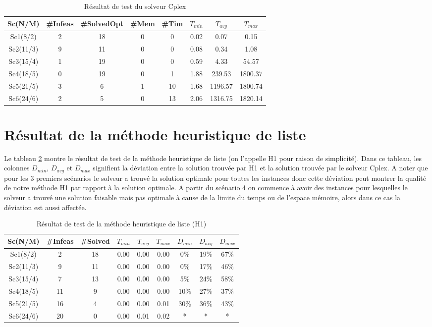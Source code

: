 \documentclass[twoside,fleqn]{EPURapport}
\begin{document}
\begin{table}[h]
    \centering
    \begin{tabular}{|c|c|c|c|c|c|c|c|}
    	\hline
    	Sc(N/M)	& \#Infeas & \#SolvedOpt	& \#Mem & \#Tim & $T_{min}$ & $T_{avg}$	& $T_{max}$ \\ \hline
		Sc1(8/2) & 2 & 18 & 0 & 0 &  0.02 &  0.07 &  0.15 \\ \hline
		Sc2(11/3) & 9 & 11 & 0 & 0 &  0.08 &  0.34 &  1.08 \\ \hline
		Sc3(15/4) & 1 & 19 & 0 & 0 &  0.59 &  4.33 &  54.57 \\ \hline
		Sc4(18/5) & 0 & 19 & 0 & 1 &  1.88 &  239.53 &  1800.37 \\ \hline
		Sc5(21/5) & 3 & 6 & 1 & 10 &  1.68 &  1196.57 &  1800.74 \\ \hline
		Sc6(24/6) & 2 & 5 & 0 & 13 &  2.06 &  1316.75 &  1820.14 \\	\hline
    \end{tabular}
    \label{tab_cplex}
    \caption{Résultat de test du solveur Cplex}
\end{table}


\section{Résultat de la méthode heuristique de liste}
Le tableau \ref{tab_h1} montre le résultat de test de la méthode heuristique de liste (on l'appelle H1 pour raison de simplicité). Dans ce tableau, les colonnes $D_{min}$, $D_{avg}$ et $D_{max}$ signifient la déviation entre la solution trouvée par H1 et la solution trouvée par le solveur Cplex. A noter que pour les 3 premiers scénarios le solveur a trouvé la solution optimale pour toutes les instances donc cette déviation peut montrer la qualité de notre méthode H1 par rapport à la solution optimale. A partir du scénario 4 on commence à avoir des instances pour lesquelles le solveur a trouvé une solution faisable mais pas optimale à cause de la limite du temps ou de l'espace mémoire, alors dans ce cas la déviation est aussi affectée.


\begin{table}[h]
    \centering
    \begin{tabular}{|c|c|c|c|c|c|c|c|c|}
    	\hline
    	Sc(N/M)	& \#Infeas & \#Solved	& $T_{min}$ & $T_{avg}$	& $T_{max}$ & $D_{min}$ & $D_{avg}$	& $D_{max}$ \\ \hline
		Sc1(8/2)  & 2 & 18 & 0.00 & 0.00 & 0.00 &0\% &19\% &67\% \\ \hline
Sc2(11/3) & 9 & 11 & 0.00 & 0.00 & 0.00 &0\% &17\% &46\% \\ \hline
Sc3(15/4) & 7 & 13 & 0.00 & 0.00 & 0.00 &5\% &24\% &58\% \\ \hline
Sc4(18/5) & 11 & 9 & 0.00 & 0.00 & 0.00 &10\%& 27\%& 37\% \\ \hline
Sc5(21/5) & 16 & 4 & 0.00 & 0.00 & 0.01 &30\%& 36\%& 43\% \\ \hline
Sc6(24/6) & 20 & 0 & 0.00 & 0.01 & 0.02 & * & * & * \\ \hline
    \end{tabular}
    \label{tab_h1}
    \caption{Résultat de test de la méthode heuristique de liste (H1)}
\end{table}
\bigskip
\end{document}
